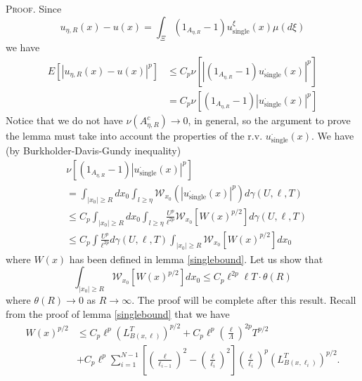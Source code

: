 \documentclass[a4paper,12pt]{article}
\begin{document}
\textsc{Proof.}\hspace{0.3cm} Since
\[
u_{\eta,R}(x)-u(x)=\int_{\Xi}\left(  1_{A_{\eta,R}}-1\right)  u_{\text{single}%
}^{\xi}\left(  x\right)  \mu(d\xi)
\]
we have
\begin{align*}
E\left[  \left|  u_{\eta,R}(x)-u(x)\right|  ^{p}\right]   &  \leq C_{p}%
\nu\left[  \left|  \left(  1_{A_{\eta,R}}-1\right)  u_{\text{single}}^{\cdot
}\left(  x\right)  \right|  ^{p}\right] \\
&  =C_{p}\nu\left[  \left(  1_{A_{\eta,R}}-1\right)  \left|  u_{\text{single}%
}^{\cdot}\left(  x\right)  \right|  ^{p}\right]
\end{align*}
Notice that we do not have $\nu\left(  A_{\eta,R}^{c}\right)  \rightarrow0$,
in general, so the argument to prove the lemma must take into account the
properties of the r.v. $u_{\text{single}}^{\cdot}\left(  x\right)  $. We have
(by Burkholder-Davis-Gundy inequality)
\begin{align*}
&  \nu\left[  \left(  1_{A_{\eta,R}}-1\right)  \left|  u_{\text{single}%
}^{\cdot}\left(  x\right)  \right|  ^{p}\right] \\
&  =\int_{\left|  x_{0}\right|  \geq R}dx_{0}\int_{l\geq\eta}\mathcal{W}%
_{x_{0}}(\left|  u_{\text{single}}^{\cdot}\left(  x\right)  \right|
^{p})d\gamma(U,\ell,T)\\
&  \leq C_{p}\int_{\left|  x_{0}\right|  \geq R}dx_{0}\int_{l\geq\eta}%
\frac{U^{p}}{\ell^{2p}}\mathcal{W}_{x_{0}}\left[  W(x)^{p/2}\right]
d\gamma(U,\ell,T)\\
&  \leq C_{p}\int\frac{U^{p}}{\ell^{2p}}d\gamma(U,\ell,T)\int_{\left|
x_{0}\right|  \geq R}\mathcal{W}_{x_{0}}\left[  W(x)^{p/2}\right]  dx_{0}%
\end{align*}
where $W(x)$ has been defined in lemma \ref{singlebound}. Let us show that
\begin{equation}
\int_{\left|  x_{0}\right|  \geq R}\mathcal{W}_{x_{0}}\left[  W(x)^{p/2}%
\right]  dx_{0}\leq C_{p}\ell^{2p}\ell T\cdot\theta\left(  R\right)
\label{key}%
\end{equation}
where $\theta\left(  R\right)  \rightarrow0$ as $R\rightarrow\infty$. The
proof will be complete after this result. Recall from the proof of lemma
\ref{singlebound} that we have
\begin{align*}
W(x)^{p/2}  &  \leq C_{p}\ell^{p}(L_{B(x,\ell)}^{T})^{p/2}+C_{p}\ell
^{p}\left(  \frac{\ell}{\Lambda}\right)  ^{2p}T^{p/2}\\
&  +C_{p}\ell^{p}\sum_{i=1}^{N-1}\left[  \left(  \frac{\ell}{\ell_{i-1}%
}\right)  ^{2}-\left(  \frac{\ell}{\ell_{i}}\right)  ^{2}\right]  \left(
\frac{\ell}{\ell_{i}}\right)  ^{p}(L_{B(x,\ell_{i})}^{T})^{p/2}.
\end{align*}
\end{document}
